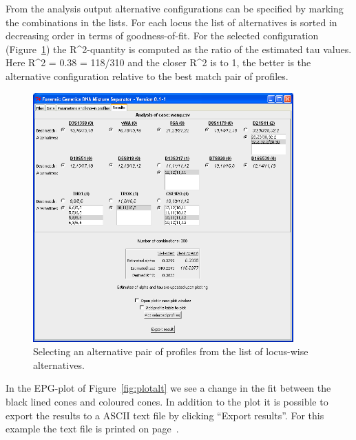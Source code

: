 \documentclass[a4paper,11pt]{article}
\begin{document}
From the analysis output alternative configurations can be specified
by marking the combinations in the lists. For each locus the list of
alternatives is sorted in decreasing order in terms of
goodness-of-fit. For the selected configuration
(Figure~\ref{fig:resultalt}) the R\^{}2-quantity is computed as the
ratio of the estimated tau values. Here R\^{}2 = 0.38 = 118/310 and
the closer R\^{}2 is to 1, the better is the alternative configuration
relative to the best match pair of profiles.

\begin{figure}[!h]
  \centering
  \includegraphics[width=10cm]{result_alternative}
  \caption{\label{fig:resultalt}Selecting an alternative pair of
    profiles from the list of locus-wise alternatives.}
\end{figure}

In the EPG-plot of Figure~\ref{fig:plotalt} we see a change in the fit
between the black lined cones and coloured cones. In addition to the
plot it is possible to export the results to a ASCII text file by
clicking ``Export results''. For this example the text file is printed
on page~\pageref{page:example}.

\newpage\phantom{emptyspace}\newpage
\end{document}
